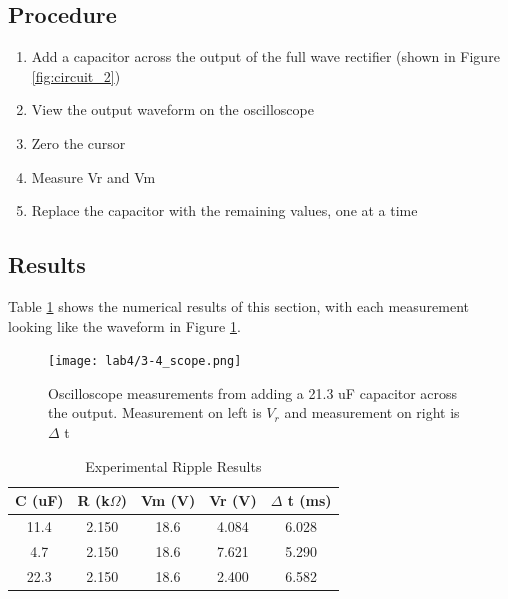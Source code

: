 \documentclass[12pt,letterpaper]{report}
\begin{document}
\subsection*{Procedure}

\begin{enumerate}
\item Add a capacitor across the output of the full wave rectifier (shown in Figure \ref{fig:circuit_2})
\item View the output waveform on the oscilloscope
\item Zero the cursor
\item Measure Vr and Vm
\item Replace the capacitor with the remaining values, one at a time
\end{enumerate}

\subsection*{Results}
Table \ref{table:ripple_results} shows the numerical results of this section, with each measurement looking like the waveform in Figure \ref{fig:3-4_scope}. 
\begin{figure}[H]
\centering
\texttt{[image: lab4/3-4\_scope.png]}
\caption{Oscilloscope measurements from adding a 21.3 uF capacitor across the output. Measurement on left is $V_r$ and measurement on right is $\Delta$ t}
\label{fig:3-4_scope}
\end{figure}

\begin{table}[ht]
\caption{Experimental Ripple Results} %
\centering 
    \begin{tabular}{| c | c | c | c | c |}
    \hline  
    C (uF) & R (k$\Omega$) & Vm (V) & Vr (V) & $\Delta$ t (ms)\\
    \hline
    11.4 & 2.150 & 18.6 & 4.084 & 6.028 \\
    4.7 & 2.150 & 18.6 & 7.621 & 5.290 \\
    22.3 & 2.150 & 18.6 &  2.400 & 6.582 \\
    \hline
    \end{tabular}
    \label{table:ripple_results}
\end{table}

\end{document}
